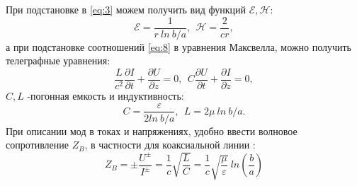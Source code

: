 При подстановке в \eqref{eq:3} можем получить вид функций $\mathcal{E},\mathcal{H}$:
\begin{equation}
        \mathcal{E} =\frac{1}{r~ ln~ b/a},~~\mathcal{H} = \frac{2}{c r},  
    \label{eq:8}
\end{equation}
а при подстановке соотношений \eqref{eq:8} в уравнения Максвелла, можно получить телеграфные уравнения:
\begin{equation}
        \frac{L}{c^2} \frac{ \partial I}{\partial t} + \frac{\partial U}{\partial z} = 0,~~
        C \frac{ \partial U}{\partial t} + \frac{\partial I}{\partial z} = 0,
    \label{eq:9}
\end{equation}
$C,L$ -погонная емкость и индуктивность:
\begin{equation}
    C = \frac{\varepsilon}{2 ln ~b/a},~~ L = 2 \mu ~ln~ b/a.
    \label{eq:10}
\end{equation}
При описании мод в токах и напряжениях, удобно ввести волновое сопротивление $Z_B$, в частности для коаксиальной линии :
\begin{equation}
    Z_B = \pm \frac{U^{\pm}}{I^{\pm}} = \frac{1}{c} \sqrt{\frac{L}{C}} = \frac{1}{c} \sqrt{\frac{\mu}{\varepsilon}}~ln (\frac{b}{a})
    \label{eq:11}
\end{equation}

